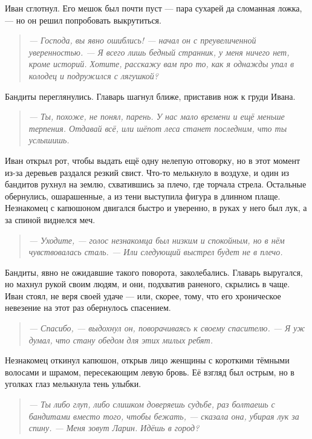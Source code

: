 \documentclass[12pt,a4paper]{book} %
\newenvironment{dialogue}{\begin{quote}\itshape}{\end{quote}}
\begin{document}
Иван сглотнул. Его мешок был почти пуст --- пара сухарей да сломанная ложка, --- но он решил попробовать выкрутиться.

\begin{dialogue}
--- Господа, вы явно ошиблись! --- начал он с преувеличенной уверенностью. --- Я всего лишь бедный странник, у меня ничего нет, кроме историй. Хотите, расскажу вам про то, как я однажды упал в колодец и подружился с лягушкой?
\end{dialogue}

Бандиты переглянулись. Главарь шагнул ближе, приставив нож к груди Ивана.

\begin{dialogue}
--- Ты, похоже, не понял, парень. У нас мало времени и ещё меньше терпения. Отдавай всё, или шёпот леса станет последним, что ты услышишь.
\end{dialogue}

Иван открыл рот, чтобы выдать ещё одну нелепую отговорку, но в этот момент из-за деревьев раздался резкий свист. Что-то мелькнуло в воздухе, и один из бандитов рухнул на землю, схватившись за плечо, где торчала стрела. Остальные обернулись, ошарашенные, а из тени выступила фигура в длинном плаще. Незнакомец с капюшоном двигался быстро и уверенно, в руках у него был лук, а за спиной виднелся меч.

\begin{dialogue}
--- Уходите, --- голос незнакомца был низким и спокойным, но в нём чувствовалась сталь. --- Или следующий выстрел будет не в плечо.
\end{dialogue}

Бандиты, явно не ожидавшие такого поворота, заколебались. Главарь выругался, но махнул рукой своим людям, и они, подхватив раненого, скрылись в чаще. Иван стоял, не веря своей удаче --- или, скорее, тому, что его хроническое невезение на этот раз обернулось спасением.

\begin{dialogue}
--- Спасибо, --- выдохнул он, поворачиваясь к своему спасителю. --- Я уж думал, что стану обедом для этих милых ребят.
\end{dialogue}

Незнакомец откинул капюшон, открыв лицо женщины с короткими тёмными волосами и шрамом, пересекающим левую бровь. Её взгляд был острым, но в уголках глаз мелькнула тень улыбки.

\begin{dialogue}
--- Ты либо глуп, либо слишком доверяешь судьбе, раз болтаешь с бандитами вместо того, чтобы бежать, --- сказала она, убирая лук за спину. --- Меня зовут Ларин. Идёшь в город?
\end{dialogue}
\end{document}
